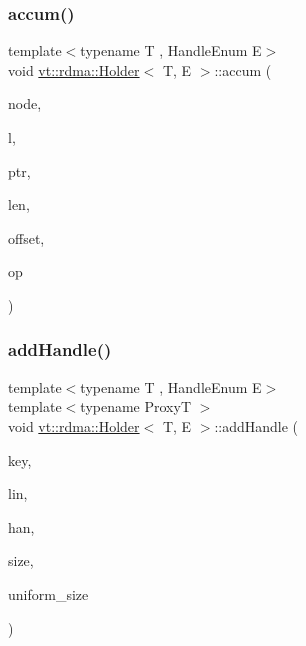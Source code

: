 \mbox{\label{structvt_1_1rdma_1_1_holder_affd535937b2b5e3bd243e4cae43d779e}} 
\subsubsection{\texorpdfstring{accum()}{accum()}}
{\footnotesize\ttfamily template$<$typename T , Handle\+Enum E$>$ \\
void \hyperlink{structvt_1_1rdma_1_1_holder}{vt\+::rdma\+::\+Holder}$<$ T, E $>$\+::accum (\begin{DoxyParamCaption}\item[{\hyperlink{namespacevt_a866da9d0efc19c0a1ce79e9e492f47e2}{vt\+::\+Node\+Type}}]{node,  }\item[{\hyperlink{namespacevt_1_1rdma_ac5c20b41a653e520b6305d4d454ecb70}{Lock}}]{l,  }\item[{T $\ast$}]{ptr,  }\item[{std\+::size\+\_\+t}]{len,  }\item[{int}]{offset,  }\item[{M\+P\+I\+\_\+\+Op}]{op }\end{DoxyParamCaption})}

\mbox{\label{structvt_1_1rdma_1_1_holder_ab5feb3bca7aad2b37c7249f3abf7ab05}} 
\subsubsection{\texorpdfstring{add\+Handle()}{addHandle()}}
{\footnotesize\ttfamily template$<$typename T , Handle\+Enum E$>$ \\
template$<$typename ProxyT $>$ \\
void \hyperlink{structvt_1_1rdma_1_1_holder}{vt\+::rdma\+::\+Holder}$<$ T, E $>$\+::add\+Handle (\begin{DoxyParamCaption}\item[{\hyperlink{structvt_1_1rdma_1_1_handle_key}{Handle\+Key}}]{key,  }\item[{\hyperlink{namespacevt_1_1rdma_a38e310504e675aa1bcaf7811019b0df2}{Elem\+Type}}]{lin,  }\item[{\hyperlink{structvt_1_1rdma_1_1_handle}{Handle}$<$ T, E $>$}]{han,  }\item[{std\+::size\+\_\+t}]{size,  }\item[{bool}]{uniform\+\_\+size }\end{DoxyParamCaption})\hspace{0.3cm}{\ttfamily [private]}}


